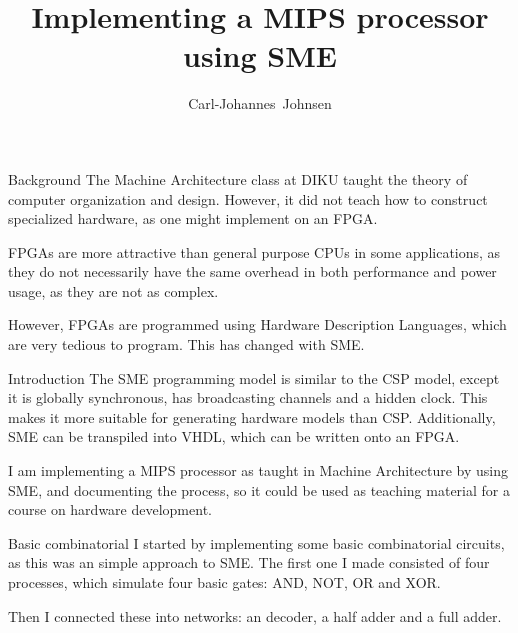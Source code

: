 \documentclass{beamer}
\title{Implementing a MIPS processor using SME}
\author[Carl-Johannes Johnsen]{
  \mbox{Carl-Johannes Johnsen}}
\institute{Department of Computer Science\\
           University of Copenhagen}
\begin{document}
\frame{\titlepage}



\begin{frame}{Background}
  The Machine Architecture class at DIKU taught the theory of computer organization and design. However, it did not teach how to construct specialized hardware, as one might implement on an FPGA.

  \vspace{\baselineskip}
  FPGAs are more attractive than general purpose CPUs in some applications, as they do not necessarily have the same overhead in both performance and power usage, as they are not as complex.

  \vspace{\baselineskip}
  However, FPGAs are programmed using Hardware Description Languages, which are very tedious to program. This has changed with SME.
\end{frame}

\begin{frame}{Introduction}
  The SME programming model is similar to the CSP model, except it is globally synchronous, has broadcasting channels and a hidden clock. This makes it more suitable for generating hardware models than CSP. Additionally, SME can be transpiled into VHDL, which can be written onto an FPGA.

  \vspace{\baselineskip}
  I am implementing a MIPS processor as taught in Machine Architecture by using SME, and documenting the process, so it could be used as teaching material for a course on hardware development.
\end{frame}

\begin{frame}{Basic combinatorial}
  I started by implementing some basic combinatorial circuits, as this was an simple approach to SME. The first one I made consisted of four processes, which simulate four basic gates: AND, NOT, OR and XOR.

  \vspace{\baselineskip}
  Then I connected these into networks: an decoder, a half adder and a full adder.
\end{frame}
\end{document}
